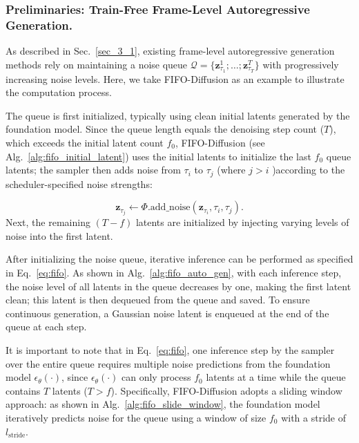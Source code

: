 \documentclass{article}
\theoremstyle{plain}
\theoremstyle{definition}
\theoremstyle{remark}
\begin{document}
\subsubsection{Preliminaries: Train-Free Frame-Level Autoregressive Generation.}
\label{app:pseudocode_initial_fifo}

As described in Sec.~\ref{sec_3_1}, existing frame-level autoregressive generation methods rely on maintaining a noise queue $\mathcal{Q} = \{\mathbf{z}_{\tau_1}^1;\ldots; \mathbf{z}_{\tau_T}^T\}$ with progressively increasing noise levels.
Here, we take FIFO-Diffusion \cite{kim2024fifo} as an example to illustrate the computation process. 


The queue is first initialized, typically using clean initial latents generated by the foundation model. Since the queue length equals the denoising step count ($T$), which exceeds the initial latent count $f_0$, FIFO-Diffusion (see Alg.~\ref{alg:fifo_initial_latent}) uses the initial latents to initialize the last $f_0$ queue latents; the sampler \cite{ho2020denoising,lipman2022flow}  then adds noise from $\tau_{i}$ to $\tau_{j}$ (where $j > i$ )according to the scheduler-specified noise strengths:

\begin{equation}
\mathbf{z}_{\tau_{j}} \gets \Phi.\mathrm{add\_noise}(\mathbf{z}_{\tau_{i}} , \tau_{i},\tau_{j}).
\end{equation}
Next, the remaining $(T-f)$ latents are initialized by injecting varying levels of noise into the first latent.


After initializing the noise queue, iterative inference can be performed as specified in Eq.~\ref{eq:fifo}. As shown in Alg.~\ref{alg:fifo_auto_gen}, with each inference step, the noise level of all latents in the queue decreases by one, making the first latent clean; this latent is then dequeued from the queue and saved. To ensure continuous generation, a Gaussian noise latent is enqueued at the end of the queue at each step.


It is important to note that in Eq.~\ref{eq:fifo}, one inference step by the sampler over the entire queue requires multiple noise predictions from the foundation model $\epsilon_{\theta}(\cdot)$, since $\epsilon_{\theta}(\cdot)$ can only process $f_0$ latents at a time while the queue contains $T$ latents ($T>f$). Specifically, FIFO-Diffusion adopts a sliding window approach: as shown in Alg.~\ref{alg:fifo_slide_window}, the foundation model iteratively predicts noise for the queue using a window of size $f_0$ with a stride of $l_{\mathrm{stride}}$.
\end{document}
